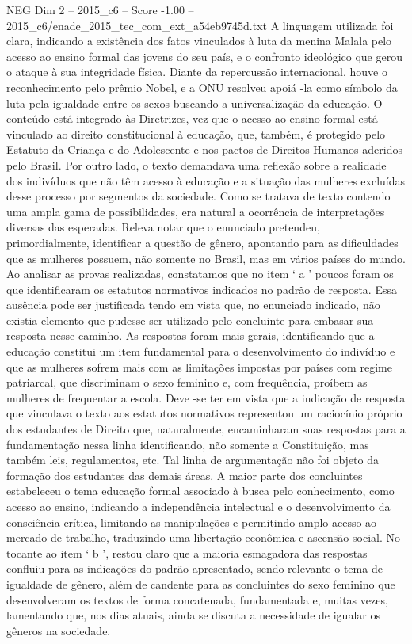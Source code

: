 \begin{textsample}{NEG Dim 2 – 2015\_c6 – Score -1.00 – 2015\_c6/enade\_2015\_tec\_com\_ext\_a54eb9745d.txt}
A linguagem utilizada foi clara, indicando a existência dos fatos vinculados à luta da menina Malala pelo acesso ao ensino formal das jovens do seu país, e o confronto ideológico que gerou o ataque à sua integridade física.
Diante da repercussão internacional, houve o reconhecimento pelo prêmio Nobel, e a ONU resolveu apoiá -la como símbolo da luta pela igualdade entre os sexos buscando a universalização da educação.
O conteúdo está integrado às Diretrizes, vez que o acesso ao ensino formal está vinculado ao direito constitucional à educação, que, também, é protegido pelo Estatuto da Criança e do Adolescente e nos pactos de Direitos Humanos aderidos pelo Brasil.
Por outro lado, o texto demandava uma reflexão sobre a realidade dos indivíduos que não têm acesso à educação e a situação das mulheres excluídas desse processo por segmentos da sociedade.
Como se tratava de texto contendo uma ampla gama de possibilidades, era natural a ocorrência de interpretações diversas das esperadas.
Releva notar que o enunciado pretendeu, primordialmente, identificar a questão de gênero, apontando para as dificuldades que as mulheres possuem, não somente no Brasil, mas em vários países do mundo.
Ao analisar as provas realizadas, constatamos que no item ‘ a ’ poucos foram os que identificaram os estatutos normativos indicados no padrão de resposta.
Essa ausência pode ser justificada tendo em vista que, no enunciado indicado, não existia elemento que pudesse ser utilizado pelo concluinte para embasar sua resposta nesse caminho.
As respostas foram mais gerais, identificando que a educação constitui um item fundamental para o desenvolvimento do indivíduo e que as mulheres sofrem mais com as limitações impostas por países com regime patriarcal, que discriminam o sexo feminino e, com frequência, proíbem as mulheres de frequentar a escola.
Deve -se ter em vista que a indicação de resposta que vinculava o texto aos estatutos normativos representou um raciocínio próprio dos estudantes de Direito que, naturalmente, encaminharam suas respostas para a fundamentação nessa linha identificando, não somente a Constituição, mas também leis, regulamentos, etc.
Tal linha de argumentação não foi objeto da formação dos estudantes das demais áreas.
A maior parte dos concluintes estabeleceu o tema educação formal associado à busca pelo conhecimento, como acesso ao ensino, indicando a independência intelectual e o desenvolvimento da consciência crítica, limitando as manipulações e permitindo amplo acesso ao mercado de trabalho, traduzindo uma libertação econômica e ascensão social.
No tocante ao item ‘ b ’, restou claro que a maioria esmagadora das respostas confluiu para as indicações do padrão apresentado, sendo relevante o tema de igualdade de gênero, além de candente para as concluintes do sexo feminino que desenvolveram os textos de forma concatenada, fundamentada e, muitas vezes, lamentando que, nos dias atuais, ainda se discuta a necessidade de igualar os gêneros na sociedade.

\end{textsample}
